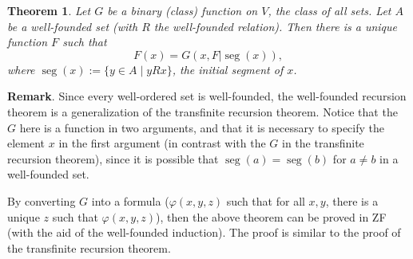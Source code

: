 \documentclass[12pt]{article}
\newtheorem{thm}{Theorem}
\begin{document}
\begin{thm} Let $G$ be a binary (class) function on $V$, the class of all sets.  Let $A$ be a well-founded set (with $R$ the well-founded relation).  Then there is a unique function $F$ such that $$F(x)=G(x,F|\operatorname{seg}(x)),$$
where $\operatorname{seg}(x):=\lbrace y\in A\mid yRx\rbrace$, the initial segment of $x$.
\end{thm}

\textbf{Remark}.  Since every well-ordered set is well-founded, the well-founded recursion theorem is a generalization of the transfinite recursion theorem.  Notice that the $G$ here is a function in two arguments, and that it is necessary to specify the element $x$ in the first argument (in contrast with the $G$ in the transfinite recursion theorem), since it is possible that $\operatorname{seg}(a)=\operatorname{seg}(b)$ for $a\ne b$ in a well-founded set. 

By converting $G$ into a formula ($\varphi(x,y,z)$ such that for all $x,y$, there is a unique $z$ such that $\varphi(x,y,z)$), then the above theorem can be proved in ZF (with the aid of the well-founded induction).  The proof is similar to the proof of the transfinite recursion theorem.
\end{document}
